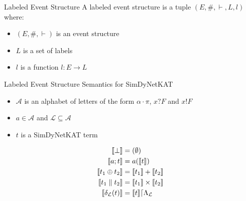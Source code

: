 \begin{frame}{Labeled Event Structure}
    A labeled event structure is a tuple $(E,\#,\vdash,L,l)$
    where:
    \begin{itemize}
        \item $(E,\#,\vdash)$ is an event structure
        \item $L$ is a set of labels
        \item $l$ is a function $l : E \rightarrow L$
    \end{itemize}
\end{frame}

\begin{frame}{Labeled Event Structure Semantics for SimDyNetKAT}
    \begin{itemize}
        \item $\mathcal{A}$ is an alphabet of letters of the form
              $\alpha\cdot\pi$, $x?F$ and $x!F$
        \item $a \in \mathcal{A}$ and $\mathcal{L} \subseteq \mathcal{A}$
        \item $t$ is a SimDyNetKAT term
    \end{itemize}
    \begin{align*}
        \llbracket \bot \rrbracket              & = (\emptyset)                                \\
        \llbracket a;t \rrbracket               & = a(\llbracket t \rrbracket)                          \\
        \llbracket t_1 \oplus t_2 \rrbracket    & = \llbracket t_1 \rrbracket + \llbracket t_2 \rrbracket               \\
        \llbracket t_1 \parallel t_2 \rrbracket & = \llbracket t_1 \rrbracket \times \llbracket t_2 \rrbracket          \\
        \llbracket \delta_{\mathcal{L}}(t) \rrbracket
                                & = \llbracket t \rrbracket\lceil \Lambda_{\mathcal{L}}
    \end{align*}

\end{frame}

